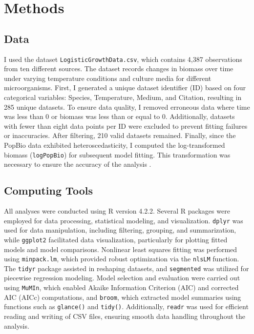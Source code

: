 \documentclass[12pt]{article}
\begin{document}
\section{Methods}

\subsection{Data}
I used the dataset \texttt{LogisticGrowthData.csv}, which contains 4,387 observations from ten different sources. The dataset records changes in biomass over time under varying temperature conditions and culture media for different microorganisms. First, I generated a unique dataset identifier (ID) based on four categorical variables: Species, Temperature, Medium, and Citation, resulting in 285 unique datasets. To ensure data quality, I removed erroneous data where time was less than 0 or biomass was less than or equal to 0. Additionally, datasets with fewer than eight data points per ID were excluded to prevent fitting failures or inaccuracies. After filtering, 210 valid datasets remained. Finally, since the PopBio data exhibited heteroscedasticity, I computed the log-transformed biomass (\texttt{logPopBio}) for subsequent model fitting. This transformation was necessary to ensure the accuracy of the analysis \citep{Schaffner1998}.

\subsection{Computing Tools}
All analyses were conducted using R version 4.2.2. Several R packages were employed for data processing, statistical modeling, and visualization. \texttt{dplyr} was used for data manipulation, including filtering, grouping, and summarization, while \texttt{ggplot2} facilitated data visualization, particularly for plotting fitted models and model comparisons. Nonlinear least squares fitting was performed using \texttt{minpack.lm}, which provided robust optimization via the \texttt{nlsLM} function. The \texttt{tidyr} package assisted in reshaping datasets, and \texttt{segmented} was utilized for piecewise regression modeling. Model selection and evaluation were carried out using \texttt{MuMIn}, which enabled Akaike Information Criterion (AIC) and corrected AIC (AICc) computations, and \texttt{broom}, which extracted model summaries using functions such as \texttt{glance()} and \texttt{tidy()}. Additionally, \texttt{readr} was used for efficient reading and writing of CSV files, ensuring smooth data handling throughout the analysis.
\end{document}

